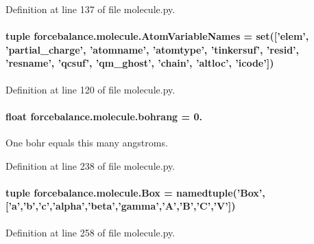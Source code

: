Definition at line 137 of file molecule.\-py.

\hypertarget{namespaceforcebalance_1_1molecule_a5daa68e835dcb9877d6c3f2fb559b54b}{
\paragraph[{Atom\-Variable\-Names}]{\setlength{\rightskip}{0pt plus 5cm}tuple forcebalance.\-molecule.\-Atom\-Variable\-Names = set(\mbox{[}'elem', 'partial\-\_\-charge', 'atomname', 'atomtype', 'tinkersuf', 'resid', 'resname', 'qcsuf', 'qm\-\_\-ghost', 'chain', 'altloc', 'icode'\mbox{]})}}\label{namespaceforcebalance_1_1molecule_a5daa68e835dcb9877d6c3f2fb559b54b}


Definition at line 120 of file molecule.\-py.

\hypertarget{namespaceforcebalance_1_1molecule_a76af9edfbaaa8999680e32aafe1b1b61}{
\paragraph[{bohrang}]{\setlength{\rightskip}{0pt plus 5cm}float forcebalance.\-molecule.\-bohrang = 0.}}\label{namespaceforcebalance_1_1molecule_a76af9edfbaaa8999680e32aafe1b1b61}


One bohr equals this many angstroms. 



Definition at line 238 of file molecule.\-py.

\hypertarget{namespaceforcebalance_1_1molecule_aa761cf1cf260e15d0b03a6f61569c840}{
\paragraph[{Box}]{\setlength{\rightskip}{0pt plus 5cm}tuple forcebalance.\-molecule.\-Box = namedtuple('Box',\mbox{[}'a','b','c','alpha','beta','gamma','A','B','C','V'\mbox{]})}}\label{namespaceforcebalance_1_1molecule_aa761cf1cf260e15d0b03a6f61569c840}


Definition at line 258 of file molecule.\-py.


